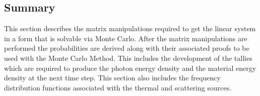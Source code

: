 \belowSubSecSkip


\subsection{Summary}
\label{sec:MonteCarlo-Summary}

\noindent
	\indent This section describes the matrix manipulations required to get the linear system in a form that is solvable via Monte Carlo. After the matrix manipulations are performed the probabilities are derived along with their associated proofs to be used with the Monte Carlo Method. This includes the development of the tallies which are required to produce the photon energy density and the material energy density at the next time step. This section also includes the frequency distribution functions associated with the thermal and scattering sources.

